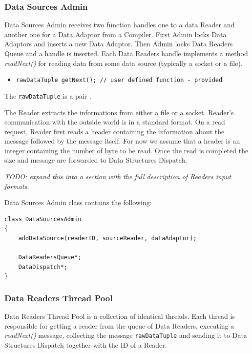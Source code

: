 \documentclass[11pt]{article}
\begin{document}
\subsubsection{Data Sources Admin}

Data Sources Admin receives two function handles one to a data Reader and another one for a Data Adaptor from a Compiler. First Admin locks Data Adaptors and inserts a new Data Adaptor. Then Admin locks Data Readers Queue  and a handle is inserted. Each Data Readers handle implements a method \emph{readNext()} for reading data from some data source (typically a socket or a file).

\begin{itemize}
	\item {\tt rawDataTuple getNext(); // user defined function - provided}
\end{itemize}

\noindent The {\tt rawDataTuple} is a pair {\tt <size, bit-string>}.

The Reader extracts the informations from either a file or a socket. Reader's communication with the outside world is in a standard format. On a read request, Reader first reads a header containing the information about the message followed by the message itself. For now we assume that a header is an integer containing the number of byte to be read. Once the read is completed the size and message are forwarded to Data Structures Dispatch.

\emph{TODO: expand this into a section with the full description of Readers input formats}.

\noindent Data Sources Admin class contains the following:
\begin{verbatim}
class DataSourcesAdmin
{
    addDataSource(readerID, sourceReader, dataAdaptor);

    DataReadersQueue*;
    DataDispatch*;
}
\end{verbatim}


\subsubsection{Data Readers Thread Pool}

Data Readers Thread Pool is a collection of identical threads. Each thread is responsible for getting a reader from the queue of Data Readers, executing a \emph{readNext()} message, collecting the message {\tt rawDataTuple} and sending it to Data Structures Dispatch together with the ID of a Reader.
\end{document}
